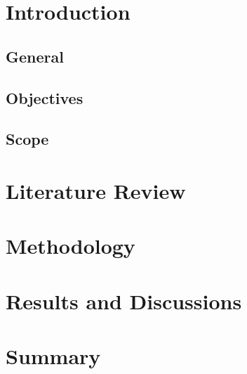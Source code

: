 \documentclass{article}
\begin{document}
	
	\section{Introduction}
	
		\subsection{General}
	
		\subsection{Objectives}
	
		\subsection{Scope}
	
	\section{Literature Review}
	
	\section{Methodology}
	
	\section{Results and Discussions}
	
	\section{Summary}
\end{document}
